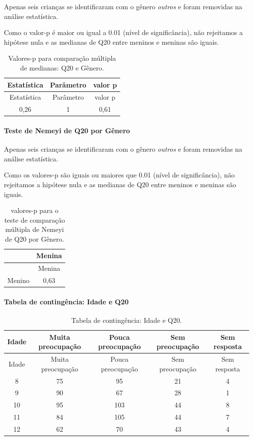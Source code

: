 \documentclass[]{article}
\let\oldparagraph\paragraph
\renewcommand{\paragraph}[1]{\oldparagraph{#1}\mbox{}}
\begin{document}
Apenas seis crianças se identificaram com o gênero \emph{outros} e foram removidas na análise estatística.

Como o valor-p é maior ou igual a 0.01 (nível de significância), não rejeitamos a hipótese nula e as medianas de Q20 entre meninos e meninas são iguais.

\begin{longtable}[]{@{}ccc@{}}
\caption{\label{tab:unnamed-chunk-383}Valores-p para comparação múltipla de medianas: Q20 e Gênero.}\tabularnewline
\toprule
Estatística & Parâmetro & valor p\tabularnewline
\midrule
\endfirsthead
\toprule
Estatística & Parâmetro & valor p\tabularnewline
\midrule
\endhead
0,26 & 1 & 0,61\tabularnewline
\bottomrule
\end{longtable}

\hypertarget{teste-de-nemeyi-de-q20-por-guxeanero}{%
\paragraph{Teste de Nemeyi de Q20 por Gênero}\label{teste-de-nemeyi-de-q20-por-guxeanero}}

Apenas seis crianças se identificaram com o gênero \emph{outros} e foram removidas na análise estatística.

Como os valores-p são iguais ou maiores que 0.01 (nível de significância), não rejeitamos a hipótese nula e as medianas de Q20 entre meninos e meninas são iguais.

\begin{longtable}[]{@{}lc@{}}
\caption{\label{tab:unnamed-chunk-385}valores-p para o teste de comparação múltipla de Nemeyi de Q20 por Gênero.}\tabularnewline
\toprule
& Menina\tabularnewline
\midrule
\endfirsthead
\toprule
& Menina\tabularnewline
\midrule
\endhead
Menino & 0,63\tabularnewline
\bottomrule
\end{longtable}

\cleardoublepage

\hypertarget{tabela-de-continguxeancia-idade-e-q20}{%
\paragraph{Tabela de contingência: Idade e Q20}\label{tabela-de-continguxeancia-idade-e-q20}}

\begin{longtable}[]{@{}ccccc@{}}
\caption{\label{tab:unnamed-chunk-386}Tabela de contingência: Idade e Q20.}\tabularnewline
\toprule
Idade & Muita preocupação & Pouca preocupação & Sem preocupação & Sem resposta\tabularnewline
\midrule
\endfirsthead
\toprule
Idade & Muita preocupação & Pouca preocupação & Sem preocupação & Sem resposta\tabularnewline
\midrule
\endhead
8 & 75 & 95 & 21 & 4\tabularnewline
9 & 90 & 67 & 28 & 1\tabularnewline
10 & 95 & 103 & 44 & 8\tabularnewline
11 & 84 & 105 & 44 & 7\tabularnewline
12 & 62 & 70 & 43 & 4\tabularnewline
\bottomrule
\end{longtable}
\end{document}
